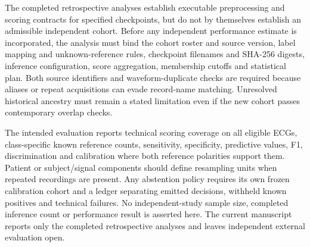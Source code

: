 The completed retrospective analyses establish executable preprocessing and scoring contracts for specified checkpoints, but do not by themselves establish an admissible independent cohort. Before any independent performance estimate is incorporated, the analysis must bind the cohort roster and source version, label mapping and unknown-reference rules, checkpoint filenames and SHA-256 digests, inference configuration, score aggregation, membership cutoffs and statistical plan. Both source identifiers and waveform-duplicate checks are required because aliases or repeat acquisitions can evade record-name matching. Unresolved historical ancestry must remain a stated limitation even if the new cohort passes contemporary overlap checks.

The intended evaluation reports technical scoring coverage on all eligible ECGs, class-specific known reference counts, sensitivity, specificity, predictive values, F1, discrimination and calibration where both reference polarities support them. Patient or subject/signal components should define resampling units when repeated recordings are present. Any abstention policy requires its own frozen calibration cohort and a ledger separating emitted decisions, withheld known positives and technical failures. No independent-study sample size, completed inference count or performance result is asserted here. The current manuscript reports only the completed retrospective analyses and leaves independent external evaluation open.
